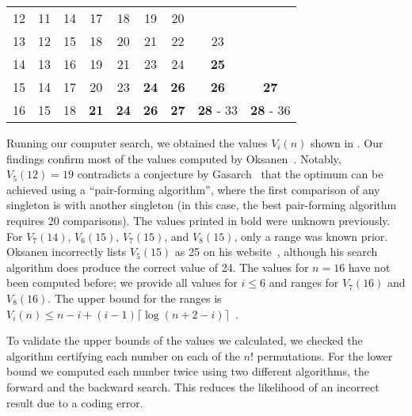 \documentclass[a4paper,UKenglish,cleveref, autoref, thm-restate]{lipics-v2021}
\begin{document}
\begin{table}[!t]
\begin{tabular}{c|cccccccc}
    12  & 11                      & 14 & 17          & 18          & 19          & 20                                                \\
    13  & 12                      & 15 & 18          & 20          & 21          & 22          & 23                                  \\
    14  & 13                      & 16 & 19          & 21          & 23          & 24          & \textbf{25}                         \\
    15  & 14                      & 17 & 20          & 23          & \textbf{24} & \textbf{26} & \textbf{26}      & \textbf{27}      \\
    16  & 15                      & 18 & \textbf{21} & \textbf{24} & \textbf{26} & \textbf{27} & \textbf{28} - 33 & \textbf{28} - 36 \\
  \end{tabular}
\end{table}

Running our computer search, we obtained the values $V_i(n)$ shown in .
Our findings confirm most of the values computed by Oksanen~\cite{Oksanen}.
Notably, $V_5(12) = 19$ contradicts a conjecture by Gasarch~\cite{Gasarch1996} that the optimum can be achieved using a ``pair-forming algorithm'', where the first comparison of any singleton is with another singleton (in this case, the best pair-forming algorithm requires 20 comparisons).
The values printed in bold were unknown previously.
For $V_7(14)$, $V_6(15)$, $V_7(15)$, and $V_8(15)$, only a range was known prior.
Oksanen incorrectly lists $V_5(15)$ as 25 on his website~\cite{Oksanen}, although his search algorithm does produce the correct value of 24.
The values for $n = 16$ have not been computed before; we provide all values for $i \leq 6$ and ranges for $V_7(16)$ and $V_8(16)$.
The upper bound for the ranges is $V_i(n) \le n - i + (i - 1) \lceil \log (n + 2 - i) \rceil$~\cite{hadian1969selecting}.

To validate the upper bounds of the values we calculated, we checked the algorithm certifying each number on each of the $n!$ permutations.
For the lower bound we computed each number twice using two different algorithms, the forward and the backward search.
This reduces the likelihood of an incorrect result due to a coding error.
\end{document}
